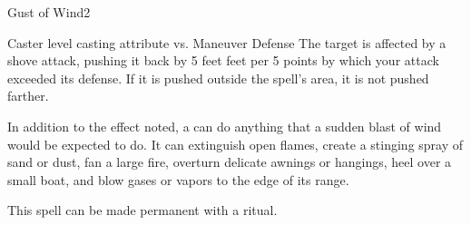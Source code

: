 \begin{spellsection}{Gust of Wind}{2}
\begin{spellheader}
\end{spellheader}
\begin{spellcontent}
    \begin{spelltargetinginfo}
    \end{spelltargetinginfo}
    \begin{spelleffects}
        \begin{spellattack}{Caster level \add casting attribute vs. Maneuver Defense}
            \spellsuccess The target is affected by a shove attack, pushing it back by 5 feet  feet per 5 points by which your attack exceeded its defense. If it is pushed outside the spell's area, it is not pushed farther.
        \end{spellattack}
    \end{spelleffects}
\end{spellcontent}
\begin{spellfooter}
    \spellnotes In addition to the effect noted, a  can do anything that a sudden blast of wind would be expected to do. It can extinguish open flames, create a stinging spray of sand or dust, fan a large fire, overturn delicate awnings or hangings, heel over a small boat, and blow gases or vapors to the edge of its range.

    This spell can be made permanent with a  ritual.
\end{spellfooter}

\begin{comment}
\subsubsection{H}
\end{comment}
\end{spellsection}

